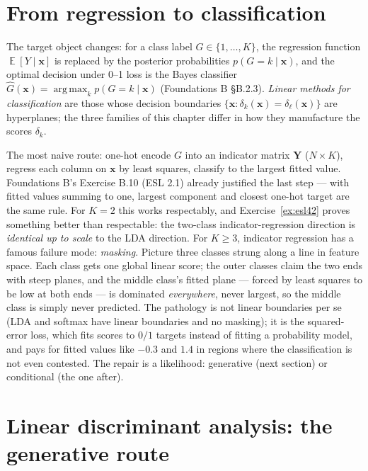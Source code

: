 \documentclass[11pt]{article}
\numberwithin{equation}{section}
\theoremstyle{plain}
\theoremstyle{definition}
\theoremstyle{remark}
\DeclareMathOperator{\E}{\mathbb{E}}
\DeclareMathOperator*{\argmax}{arg\,max}
\newcommand{\x}{\bm{x}}
\begin{document}
\section{From regression to classification}\label{sec:class}

The target object changes: for a class label $G \in \{1, \dots, K\}$, the regression function $\E[Y \mid \x]$ is replaced by the posterior probabilities $p(G = k \mid \x)$, and the optimal decision under 0--1 loss is the Bayes classifier $\hat G(\x) = \argmax_k p(G = k \mid \x)$ (Foundations B \S B.2.3). \emph{Linear methods for classification} are those whose decision boundaries $\{\x : \delta_k(\x) = \delta_\ell(\x)\}$ are hyperplanes; the three families of this chapter differ in how they manufacture the scores $\delta_k$.

The most naive route: one-hot encode $G$ into an indicator matrix $\bm{Y}$ ($N \times K$), regress each column on $\x$ by least squares, classify to the largest fitted value. Foundations B's Exercise B.10 (ESL 2.1) already justified the last step --- with fitted values summing to one, largest component and closest one-hot target are the same rule. For $K = 2$ this works respectably, and Exercise~\ref{ex:esl42} proves something better than respectable: the two-class indicator-regression direction is \emph{identical up to scale} to the LDA direction. For $K \ge 3$, indicator regression has a famous failure mode: \emph{masking}. Picture three classes strung along a line in feature space. Each class gets one global linear score; the outer classes claim the two ends with steep planes, and the middle class's fitted plane --- forced by least squares to be low at both ends --- is dominated \emph{everywhere}, never largest, so the middle class is simply never predicted. The pathology is not linear boundaries per se (LDA and softmax have linear boundaries and no masking); it is the squared-error loss, which fits scores to $0/1$ targets instead of fitting a probability model, and pays for fitted values like $-0.3$ and $1.4$ in regions where the classification is not even contested. The repair is a likelihood: generative (next section) or conditional (the one after).

\section{Linear discriminant analysis: the generative route}\label{sec:lda}
\end{document}
